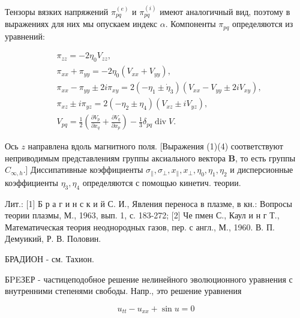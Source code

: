\documentclass[10pt]{article}
\begin{document}
Тензоры вязких напряжений $\pi_{p q}^{(e)}$ и $\pi_{p q}^{(i)}$ имеют аналогичный вид, поэтому в выражениях для них мы опускаем индекс $\alpha$. Компоненты $\pi_{p q}$ определяются из уравнений:



\[

\begin{aligned}

& \pi_{z z}=-2 \eta_{0} V_{z z}, \\

& \pi_{x x}+\pi_{y y}=-2 \eta_{0}\left(V_{x x}+V_{y y}\right), \\

& \pi_{x x}-\pi_{y y} \pm 2 i \pi_{x y}=2\left(-\eta_{1} \pm \dot{\eta}_{3}\right)\left(V_{x x}-V_{y y} \pm 2 i V_{x y}\right), \\

& \pi_{x z} \pm i \pi_{y z}=2\left(-\eta_{2} \pm \eta_{4}\right)\left(V_{x z} \pm i V_{y z}\right), \\

& V_{p q}=\frac{1}{2}\left(\frac{\partial V_{p}}{\partial x_{q}}+\frac{\partial V_{q}}{\partial x_{p}}\right)-\frac{1}{3} \delta_{p q} \operatorname{div} V .

\end{aligned}

\]



Ось $z$ направлена вдоль магнитного поля. [Выражения (1)(4) соответствуют неприводимым представлениям группы аксиального вектора $\boldsymbol{B}$, то есть группы $C_{\infty, h}$.] Диссипативные коэффициенты $\sigma_{\|}, \sigma_{\perp}, x_{\|}, x_{\perp}, \eta_{0}, \eta_{1}, \eta_{2}$ и дисперсионные коэффициенты $\eta_{3}, \eta_{4}$ определяются с помощью кинетич. теории.



Лит.: [1] Б р а г и н с к и й С. И., Явления переноса в плазме, в кн.: Вопросы теории плазмы, М., 1963, вып. 1, с. 183-272; [2] Че пмен С., Каул и н г Т., Математическая теория неоднородных газов, пер. с англ., М., 1960. В. П. Демуикий, Р. В. Половин.



БРАДИОН - см. Тахион.



БPEЗЕР - частицеподобное решение нелинейного эволюционного уравнения с внутренними степенями свободы. Напр., это решение уравнения



\[

u_{t t}-u_{x x}+\sin u=0

\]
\end{document}
